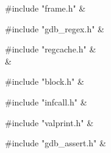 \medskip
\begin{cxreftabi}
{\stt \#include "frame.h"} &\\
\end{cxreftabi}

\medskip
\begin{cxreftabi}
{\stt \#include "gdb\_regex.h"} &\\
\end{cxreftabi}

\medskip
\begin{cxreftabi}
{\stt \#include "regcache.h"} &\\
\hspace*{0.2in}{\stt \#include "../include/ansidecl.h"} &\\
\end{cxreftabi}

\medskip
\begin{cxreftabi}
{\stt \#include "block.h"} &\\
\end{cxreftabi}

\medskip
\begin{cxreftabi}
{\stt \#include "infcall.h"} &\\
\end{cxreftabi}

\medskip
\begin{cxreftabi}
{\stt \#include "valprint.h"} &\\
\end{cxreftabi}

\medskip
\begin{cxreftabi}
{\stt \#include "gdb\_assert.h"} &\\
\end{cxreftabi}

